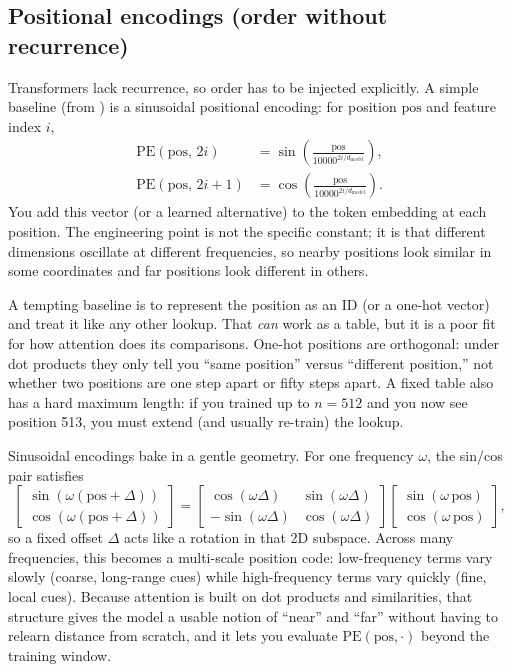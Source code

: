 \subsection{Positional encodings (order without recurrence)}
\label{sec:transformers_positional_information}
Transformers lack recurrence, so order has to be injected explicitly. A simple baseline (from \citet{Vaswani2017}) is a sinusoidal positional encoding: for position \(\mathrm{pos}\) and feature index \(i\),
\begin{equation}
\begin{aligned}
    \mathrm{PE}(\mathrm{pos},\,2i)   &= \sin\!\left(\frac{\mathrm{pos}}{10000^{2i/d_{\text{model}}}}\right),\\
    \mathrm{PE}(\mathrm{pos},\,2i+1) &= \cos\!\left(\frac{\mathrm{pos}}{10000^{2i/d_{\text{model}}}}\right).
\end{aligned}
\label{eq:transformers_sinusoidal_pe}
\end{equation}
You add this vector (or a learned alternative) to the token embedding at each position. The engineering point is not the specific constant; it is that different dimensions oscillate at different frequencies, so nearby positions look similar in some coordinates and far positions look different in others.

A tempting baseline is to represent the position as an ID (or a one-hot vector) and treat it like any other lookup. That \emph{can} work as a table, but it is a poor fit for how attention does its comparisons. One-hot positions are orthogonal: under dot products they only tell you ``same position'' versus ``different position,'' not whether two positions are one step apart or fifty steps apart. A fixed table also has a hard maximum length: if you trained up to \(n=512\) and you now see position 513, you must extend (and usually re-train) the lookup.

Sinusoidal encodings bake in a gentle geometry. For one frequency \(\omega\), the sin/cos pair satisfies
\[
\begin{bmatrix}
\sin(\omega(\mathrm{pos}+\Delta))\\
\cos(\omega(\mathrm{pos}+\Delta))
\end{bmatrix}
=
\begin{bmatrix}
\cos(\omega\Delta) & \sin(\omega\Delta)\\
-\sin(\omega\Delta) & \cos(\omega\Delta)
\end{bmatrix}
\begin{bmatrix}
\sin(\omega\,\mathrm{pos})\\
\cos(\omega\,\mathrm{pos})
\end{bmatrix},
\]
so a fixed offset \(\Delta\) acts like a rotation in that 2D subspace. Across many frequencies, this becomes a multi-scale position code: low-frequency terms vary slowly (coarse, long-range cues) while high-frequency terms vary quickly (fine, local cues). Because attention is built on dot products and similarities, that structure gives the model a usable notion of ``near'' and ``far'' without having to relearn distance from scratch, and it lets you evaluate \(\mathrm{PE}(\mathrm{pos},\cdot)\) beyond the training window.

